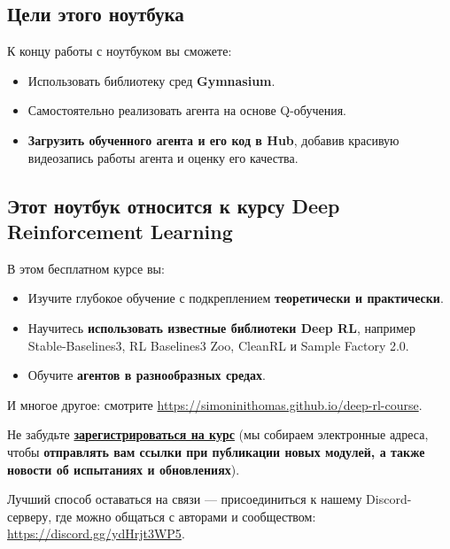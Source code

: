 \documentclass[11pt,a4paper]{article}
\begin{document}
\subsection{Цели этого ноутбука}\label{objectives-of-this-notebook}

К концу работы с ноутбуком вы сможете:

\begin{itemize}
\tightlist
\item
  Использовать библиотеку сред \textbf{Gymnasium}.
\item
  Самостоятельно реализовать агента на основе Q-обучения.
\item
  \textbf{Загрузить обученного агента и его код в Hub}, добавив красивую видеозапись работы агента и оценку его качества.
\end{itemize}

\subsection{Этот ноутбук относится к курсу Deep Reinforcement Learning}\label{this-notebook-is-from-the-deep-reinforcement-learning-course}


В этом бесплатном курсе вы:

\begin{itemize}
\tightlist
\item
  Изучите глубокое обучение с подкреплением \textbf{теоретически и практически}.
\item
  Научитесь \textbf{использовать известные библиотеки Deep RL}, например Stable-Baselines3, RL Baselines3 Zoo, CleanRL и Sample Factory 2.0.
\item
  Обучите \textbf{агентов в разнообразных средах}.
\end{itemize}

И многое другое: смотрите \url{https://simoninithomas.github.io/deep-rl-course}.

Не забудьте \textbf{\href{http://eepurl.com/ic5ZUD}{зарегистрироваться на курс}} (мы собираем электронные адреса, чтобы \textbf{отправлять вам ссылки при публикации новых модулей, а также новости об испытаниях и обновлениях}).

Лучший способ оставаться на связи --- присоединиться к нашему Discord-серверу, где можно общаться с авторами и сообществом: \url{https://discord.gg/ydHrjt3WP5}.
\end{document}
